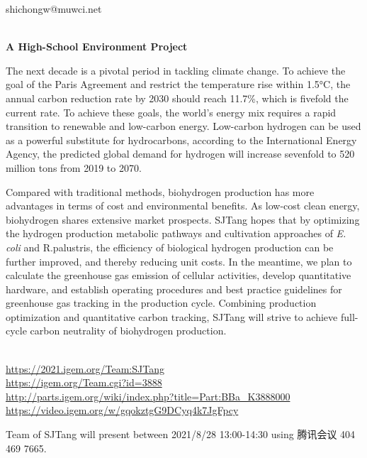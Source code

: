   shichongw@muwci.net


\textbf{\\A High-School Environment Project\\}\begin{spacing}{1.5}

The next decade is a pivotal period in tackling climate change. To achieve the goal of the Paris Agreement and restrict the temperature rise within 1.5°C, the annual carbon reduction rate by 2030 should reach 11.7\%, which is fivefold the current rate. To achieve these goals, the world's energy mix requires a rapid transition to renewable and low-carbon energy. Low-carbon hydrogen can be used as a powerful substitute for hydrocarbons, according to the International Energy Agency, the predicted global demand for hydrogen will increase sevenfold to 520 million tons from 2019 to 2070.

Compared with traditional methods, biohydrogen production has more advantages in terms of cost and environmental benefits. As low-cost clean energy, biohydrogen shares extensive market prospects. SJTang hopes that by optimizing the hydrogen production metabolic pathways and cultivation approaches of \textit{E. coli} and R.palustris, the efficiency of biological hydrogen production can be further improved, and thereby reducing unit costs. In the meantime, we plan to calculate the greenhouse gas emission of cellular activities, develop quantitative hardware, and establish operating procedures and best practice guidelines for greenhouse gas tracking in the production cycle. Combining production optimization and quantitative carbon tracking, SJTang will strive to achieve full-cycle carbon neutrality of biohydrogen production.\end{spacing}
\\

\url{https://2021.igem.org/Team:SJTang }\\
\url{https://igem.org/Team.cgi?id=3888 }\\
\url{http://parts.igem.org/wiki/index.php?title=Part:BBa_K3888000 }\\
\url{https://video.igem.org/w/gqokztgG9DCyq4k7JgFpcy }\\

\vfill{}









Team of SJTang will present between      2021/8/28 13:00-14:30   using 腾讯会议 404 469 7665.
\newpage


